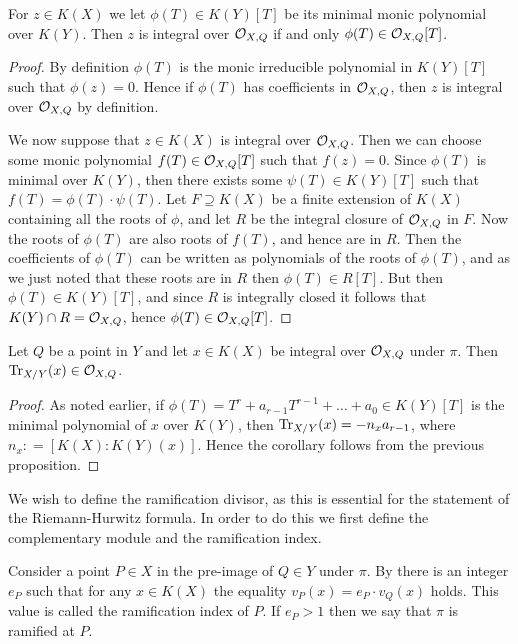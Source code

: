     \begin{prop}
    For $z\in K(X)$ we let $\phi(T)\in K(Y)[T]$ be its minimal monic polynomial over $K(Y)$.
    Then $z$ is integral over ${\cal O}_{X,Q}$ if and only $\phi (T)\in {\cal O}_{X,Q}[T]$.
    \end{prop}
    \begin{proof}
    By definition $\phi(T)$ is the monic irreducible polynomial in $K(Y)[T]$ such that $\phi(z) = 0$. 
    Hence if $\phi (T)$ has coefficients in ${\cal O}_{X,Q}$, then $z$ is integral over ${\cal O}_{X,Q}$ by definition.
    
    We now suppose that $z\in K(X)$ is integral over ${\cal O}_{X,Q}$.
    Then we can choose some monic polynomial $f(T)\in {\cal O}_{X,Q}[T]$ such that $f(z) = 0$.
    Since $\phi(T)$ is minimal over $K(Y)$, then there exists some $\psi(T)\in K(Y)[T]$ such that $f(T) = \phi(T)\cdot \psi(T)$.
    Let $F \supseteq K(X)$ be a finite extension of $K(X)$ containing all the roots of $\phi$, and let $R$ be the integral closure of ${\cal O}_{X,Q}$ in $F$.
    Now the roots of $\phi(T)$ are also roots of $f(T)$, and hence are in $R$.
    Then the coefficients of $\phi(T)$ can be written as polynomials of the roots of $\phi(T)$, and as we just noted that these roots are in $R$ then $\phi(T) \in R[T]$.
    But then $\phi(T)\in K(Y)[T]$, and since $R$ is integrally closed it follows that $K(Y)\cap R = {\cal O}_{X,Q}$, hence $\phi(T)\in {\cal O}_{X,Q}[T]$.
    \end{proof}

    \begin{cor}\label{traceinclosure}
    Let $Q$ be a point in $Y$ and let $x\in K(X)$ be integral over ${\cal O}_{X,Q}$ under $\pi$.
    Then $\operatorname{Tr}_{X/Y}(x)\in {\cal O}_{X,Q}$.
    \end{cor}
    \begin{proof}
    As noted earlier, if $\phi(T)=T^r+a_{r-1}T^{r-1} + \ldots + a_0\in K(Y)[T]$ is the minimal polynomial of $x$ over $K(Y)$, then $\operatorname{Tr}_{X/Y}(x)=-n_xa_{r-1}$, where $n_x : = [K(X):K(Y)(x)]$.
    Hence the corollary follows from the previous proposition.
    \end{proof}


We wish to define the ramification divisor, as this is essential for the statement of the Riemann-Hurwitz formula.
In order to do this we first define the complementary module and the ramification index.


    \begin{defn}
    Consider a point $P\in X$ in the pre-image of $Q\in Y$ under $\pi$.
    By \cite[Prop. 3.1.4]{stichtenoth} there is an integer $e_P$ such that for any $x\in K(X)$ the equality $v_P(x) = e_P\cdot v_Q(x)$ holds.
    This value is called the ramification index of $P$.
    If $e_P>1$ then we say that $\pi$ is ramified at $P$.
    \end{defn}

